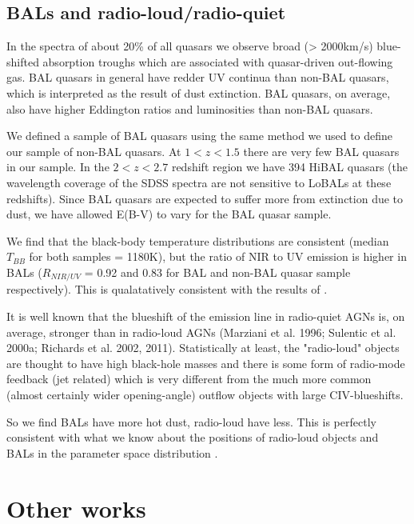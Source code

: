 \subsection{BALs and radio-loud/radio-quiet}

In the spectra of about 20\% of all quasars we observe broad (> 2000km/s) blue-shifted absorption troughs which are associated with quasar-driven out-flowing gas. 
BAL quasars in general have redder UV continua than non-BAL quasars, which is interpreted as the result of dust extinction. 
BAL quasars, on average, also have higher Eddington ratios and luminosities than non-BAL quasars.

We defined a sample of BAL quasars using the same method we used to define our sample of non-BAL quasars. 
At $1 < z < 1.5$ there are very few BAL quasars in our sample. 
In the $2 < z < 2.7$ redshift region we have 394 HiBAL quasars (the wavelength coverage of the SDSS spectra are not sensitive to LoBALs at these redshifts). 
Since BAL quasars are expected to suffer more from extinction due to dust, we have allowed E(B-V) to vary for the BAL quasar sample. 

We find that the black-body temperature distributions are consistent (median $T_{BB}$ for both samples = 1180K), but the ratio of NIR to UV emission is higher in BALs ($R_{NIR/UV}$ = 0.92 and 0.83 for BAL and non-BAL quasar sample respectively). 
This is qualatatively consistent with the results of \citet{zhang14}. 

It is well known that the blueshift of the  emission line in radio-quiet AGNs is, on average, stronger than in radio-loud AGNs (Marziani et al. 1996; Sulentic et al. 2000a; Richards et al. 2002, 2011). 
Statistically at least, the "radio-loud" objects are thought to have high black-hole masses and there is some form of radio-mode feedback (jet related) which is very different from the much more common (almost certainly wider opening-angle) outflow objects with large CIV-blueshifts.

So we find BALs have more hot dust, radio-loud have less. 
This is perfectly consistent with what we know about the positions of radio-loud objects and BALs in the  parameter space distribution \citep{richards11}. 

\section{Other works}

